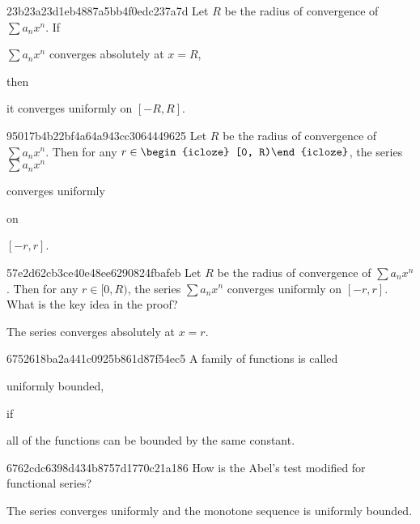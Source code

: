 \begin{note}{23b23a23d1eb4887a5bb4f0edc237a7d}
    Let \({ R }\) be the radius of convergence of \({ \sum a_n x^{n} }\).
    If \begin{icloze}{2}\({ \sum a_n x^{n} }\) converges absolutely at \({ x = R }\),\end{icloze} then \begin{icloze}{1}it converges uniformly on \({ [-R, R] }\).\end{icloze}
\end{note}

\begin{note}{95017b4b22bf4a64a943cc3064449625}
    Let \({ R }\) be the radius of convergence of \({ \sum a_n x^{n} }\).
    Then for any \({ r \in \begin{icloze}{3}[0, R)\end{icloze} }\), the series \({ \sum a_n x^{n} }\) \begin{icloze}{2}converges uniformly\end{icloze} on \begin{icloze}{1}\({ [-r, r] }\).\end{icloze}
\end{note}

\begin{note}{57e2d62cb3ce40e48ee6290824fbafeb}
    Let \({ R }\) be the radius of convergence of \({ \sum a_n x^{n} }\).
    Then for any \({ r \in [0, R) }\), the series \({ \sum a_n x^{n} }\) converges uniformly on \({ [-r, r] }\).
    What is the key idea in the proof?

    \begin{cloze}{1}
        The series converges absolutely at \({ x = r }\).
    \end{cloze}
\end{note}

\begin{note}{6752618ba2a441c0925b861d87f54ec5}
    A family of functions is called \begin{icloze}{2}uniformly bounded,\end{icloze} if \begin{icloze}{1}all of the functions can be bounded by the same constant.\end{icloze}
\end{note}

\begin{note}{6762cdc6398d434b8757d1770c21a186}
    How is the Abel's test modified for functional series?

    \begin{cloze}{1}
        The series converges uniformly and the monotone sequence is uniformly bounded.
    \end{cloze}
\end{note}

